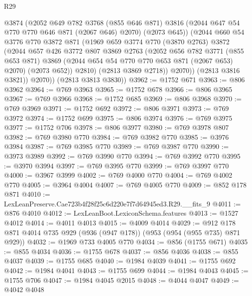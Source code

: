 \begin{lexlean}{R29}
\begin{coremodule}
              @3874
              (@2052
                @649
                @782
                @3768
                (@855 @646 @871)
                @3816
                (@2044 @647 @54 @770 @770 @646 @871 (@2067 @646) @2070)
                (@2073 @645))
              (@2044
                @660
                @54
                @3776
                @770
                @3872
                @871
                (@1969
                  @659
                  @3774
                  @770
                  (@3870 @2763)
                  @3872
                  (@2044
                    @657
                    @426
                    @3772
                    @807
                    @3869
                    @2763
                    (@2052
                      @656
                      @782
                      @3771
                      (@855 @653 @871)
                      @3869
                      (@2044 @654 @54 @770 @770 @653 @871 (@2067 @653) @2070)
                      (@2073 @652))
                    @2810)
                  (@2813 @3869 @2718))
                @2070))
            (@2813 @3816 @3821))
          @2070))
      (@2813 @3813 @3830))
@3962 := @1752 @671
@3963 := @806 @3962
@3964 := @769 @3963
@3965 := @1752 @678
@3966 := @806 @3965
@3967 := @769 @3966
@3968 := @1752 @685
@3969 := @806 @3968
@3970 := @769 @3969
@3971 := @1752 @692
@3972 := @806 @3971
@3973 := @769 @3972
@3974 := @1752 @699
@3975 := @806 @3974
@3976 := @769 @3975
@3977 := @1752 @706
@3978 := @806 @3977
@3980 := @769 @3978 @807
@3982 := @769 @3980 @770
@3984 := @769 @3982 @770
@3985 := @3976 @3984
@3987 := @769 @3985 @770
@3989 := @769 @3987 @770
@3990 := @3973 @3989
@3992 := @769 @3990 @770
@3994 := @769 @3992 @770
@3995 := @3970 @3994
@3997 := @769 @3995 @770
@3999 := @769 @3997 @770
@4000 := @3967 @3999
@4002 := @769 @4000 @770
@4004 := @769 @4002 @770
@4005 := @3964 @4004
@4007 := @769 @4005 @770
@4009 := @852 @178 @871
@4010 := LexLeanPreserve.Cae723b4f28f25c6d220e7f7d64945ed3.R29.__fits_9
@4011 := @876 @4010
@4012 := LexLeanBoot.LexiconSchema.features
@4013 := @1527 @4012
@4014 := @4011 @4013
@4015 := @4009 @4014
@4029 := @912 @178 @871 @4014 @735 @929 (@936 (@947 @178)) (@953 (@954 (@955 @735) @871 @929))
@4032 := @1969 @733 @4005 @770
@4034 := @856 (@1755 @671)
@4035 := @855 @4034
@4036 := @1755 @678
@4037 := @856 @4036
@4038 := @855 @4037
@4039 := @1755 @685
@4040 := @1984 @4039
@4041 := @1755 @692
@4042 := @1984 @4041
@4043 := @1755 @699
@4044 := @1984 @4043
@4045 := @1755 @706
@4047 := @1984 @4045 @2015
@4048 := @4044 @4047
@4049 := @4042 @4048

\end{coremodule}
\end{lexlean}
